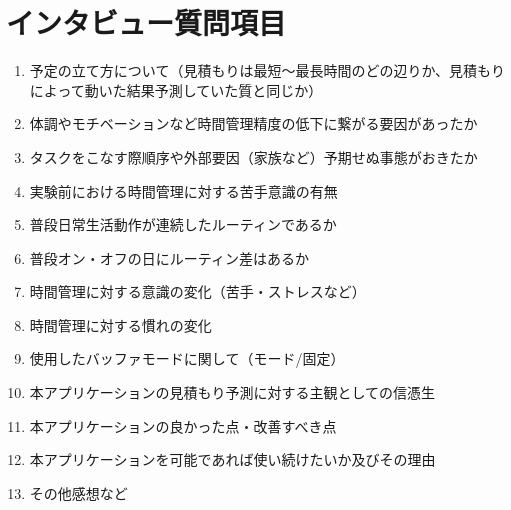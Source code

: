 \chapter{インタビュー質問項目}
  \begin{enumerate}
  \item 予定の立て方について（見積もりは最短〜最長時間のどの辺りか、見積もりによって動いた結果予測していた質と同じか）
  \item 体調やモチベーションなど時間管理精度の低下に繋がる要因があったか
  \item タスクをこなす際順序や外部要因（家族など）予期せぬ事態がおきたか
  \item 実験前における時間管理に対する苦手意識の有無
  \item 普段日常生活動作が連続したルーティンであるか
  \item 普段オン・オフの日にルーティン差はあるか
  \item 時間管理に対する意識の変化（苦手・ストレスなど）
  \item 時間管理に対する慣れの変化 
 \item 使用したバッファモードに関して（モード/固定）
  \item 本アプリケーションの見積もり予測に対する主観としての信憑生
  \item 本アプリケーションの良かった点・改善すべき点
  \item 本アプリケーションを可能であれば使い続けたいか及びその理由
  \item その他感想など
\end{enumerate}